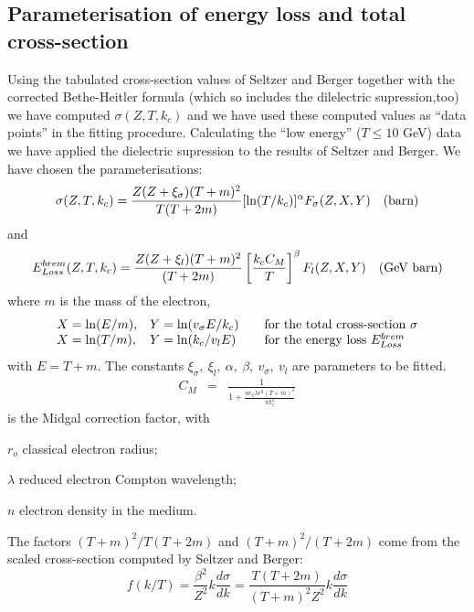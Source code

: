 \subsection{Parameterisation of energy loss and total cross-section}
Using the tabulated cross-section values of Seltzer and Berger together
with the corrected Bethe-Heitler formula (which so includes the 
 dilelectric supression,too) we have computed
$\sigma(Z,T,k_c ) $
and we have used these computed values as ``data points''
in the fitting procedure.
Calculating the ``low energy'' ($T\leq 10$ GeV) data we have applied the
dielectric supression to the results of Seltzer and Berger.
We have chosen the parameterisations:
\begin{equation}
\label{ebrem.a}
\sigma (Z,T,k_c ) =\frac{Z(Z+\xi_{\sigma} )(T+m)^2}
     {T(T+2m)}[ \ln (T/k_c )]^\alpha F_{\sigma} (Z,X,Y)
\mbox{\quad(barn)}\\
\end{equation}
and
\begin{equation}
\label{ebrem.b}
E_{Loss}^{brem} (Z,T,k_c ) =\frac{Z(Z+ \xi_l)(T+m)^2 }
      {(T+2m)}\left[\frac{k_c C_ M }{T}\right]^\beta
      F_{l} (Z,X,Y) \mbox{\quad(GeV barn)}
\end{equation}
where  $m$ is the mass of the electron,
\[
\begin{array}{lll}
X = \ln(E/m), & Y = \ln (v_{\sigma} E/k_c) &
\mbox{\quad for the total cross-section }\sigma \\
X = \ln(T/m), & Y = \ln(k_c/v_lE)       &
\mbox{\quad for the energy loss }  E_{Loss}^{brem}  \\
\end{array}
\]
with $E=T+m$.
The constants $\xi_{\sigma},\ \xi_l,\ \alpha,\ \beta,\ v_{\sigma},\ v_l$
are parameters to be fitted.
\begin{eqnarray*}
C_M &=&\frac{1}{1+\frac{n r_0 \lambda r^2  (T+m)^2}{\pi k^2_c}}
\end{eqnarray*}
is the Midgal correction factor, with
\begin{description}
\item $r_o$  classical electron radius;
\item $\lambda$  reduced electron Compton wavelength;
\item $n$  electron density in the medium.
\end{description}
The factors $(T+m)^2/T(T+2m)$ and $(T+m)^2/(T+2m)$ come from
the scaled cross-section computed by Seltzer and Berger:
\[
f(k/T) = \frac{\beta^2}{Z^2 }k\frac{d \sigma}{dk}
       = \frac{T(T+2m)} {(T+m)^2 Z^2}  k \frac{d \sigma}{dk}
\]

